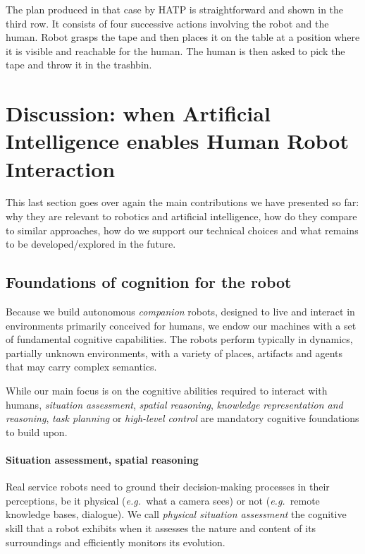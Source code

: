 \documentclass[preprint,3p,times]{elsarticle}
\newcommand{\eg}{{\textit{e.g.\ }}}
\begin{document}
The plan produced in that case by HATP is straightforward and shown in the
third row. It consists of four successive actions involving the robot and the
human. Robot grasps the tape and then places it on the table at a position
where it is visible and reachable for the human. The human is then asked to pick
the tape and throw it in the trashbin.


\section{Discussion: when Artificial Intelligence enables Human Robot
Interaction}
\label{sect|conclusion}

This last section goes over again the main contributions we have presented
so far: why they are relevant to robotics and artificial intelligence, how do
they compare to similar approaches, how do we support our technical choices and
what remains to be developed/explored in the future.

\subsection{Foundations of cognition for the robot}

Because we build autonomous \emph{companion} robots, designed to live and
interact in environments primarily conceived for humans, we endow our machines
with a set of fundamental cognitive capabilities. The robots perform typically
in dynamics, partially unknown environments, with a variety of places,
artifacts and agents that may carry complex semantics.

While our main focus is on the cognitive abilities required to interact with
humans, \emph{situation assessment}, \emph{spatial reasoning}, \emph{knowledge
representation and reasoning}, \emph{task planning} or \emph{high-level
control} are mandatory cognitive foundations to build upon.

\paragraph{Situation assessment, spatial reasoning}

Real service robots need to ground their decision-making processes in their
perceptions, be it physical (\eg what a camera sees) or not (\eg remote
knowledge bases, dialogue). We call \emph{physical situation assessment} the
cognitive skill that a robot exhibits when it assesses the nature and content of its
surroundings and efficiently monitors its evolution.
\end{document}
